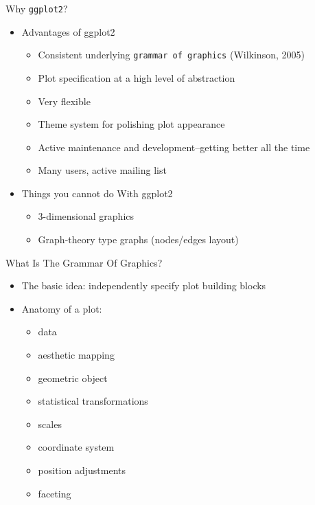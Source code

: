 \documentclass[table,smaller]{beamer}
\begin{document}
\begin{frame}[fragile,label=sec-1-3]{Why \texttt{ggplot2}?}
 \begin{itemize}
\item Advantages of ggplot2
\begin{itemize}
\item Consistent underlying \texttt{grammar of graphics} (Wilkinson, 2005)
\item Plot specification at a high level of abstraction
\item Very flexible
\item Theme system for polishing plot appearance
\item Active maintenance and development--getting better all the time
\item Many users, active mailing list
\end{itemize}
\item Things you cannot do With ggplot2
\begin{itemize}
\item 3-dimensional graphics
\item Graph-theory type graphs (nodes/edges layout)
\end{itemize}
\end{itemize}
\end{frame}

\begin{frame}[label=sec-1-4]{What Is The Grammar Of Graphics?}
\begin{itemize}
\item The basic idea: independently specify plot building blocks
\item Anatomy of a plot:
\begin{itemize}
\item data
\item aesthetic mapping
\item geometric object
\item statistical transformations
\item scales
\item coordinate system
\item position adjustments
\item faceting
\end{itemize}
\end{itemize}
\end{frame}
\end{document}
